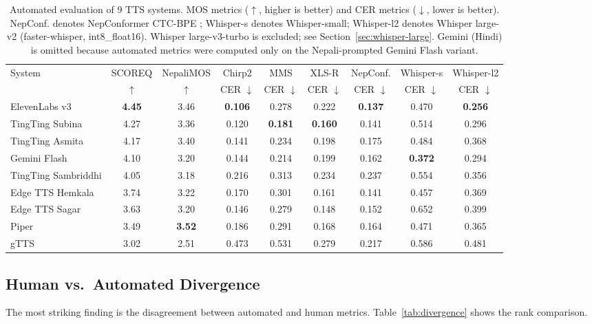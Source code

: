 \documentclass[11pt]{article}
\begin{document}
\begin{table}[t]
\centering
\caption{Automated evaluation of 9 TTS systems. MOS metrics ($\uparrow$, higher is better) and CER metrics ($\downarrow$, lower is better). NepConf. denotes NepConformer CTC-BPE \citep{poudel2026nepconformer}; Whisper-s denotes Whisper-small; Whisper-l2 denotes Whisper large-v2 (faster-whisper, int8\_float16). Whisper large-v3-turbo is excluded; see Section~\ref{sec:whisper-large}. Gemini (Hindi) is omitted because automated metrics were computed only on the Nepali-prompted Gemini Flash variant.}
\label{tab:auto_metrics}
\footnotesize
\setlength{\tabcolsep}{2pt}
\begin{tabular}{lcccccccc}
\toprule
System & SCOREQ & NepaliMOS & Chirp2 & MMS & XLS-R & NepConf. & Whisper-s & Whisper-l2 \\
 & $\uparrow$ & $\uparrow$ & CER $\downarrow$ & CER $\downarrow$ & CER $\downarrow$ & CER $\downarrow$ & CER $\downarrow$ & CER $\downarrow$ \\
\midrule
ElevenLabs v3 & \textbf{4.45} & 3.46 & \textbf{0.106} & 0.278 & 0.222 & \textbf{0.137} & 0.470 & \textbf{0.256} \\
TingTing Subina & 4.27 & 3.36 & 0.120 & \textbf{0.181} & \textbf{0.160} & 0.141 & 0.514 & 0.296 \\
TingTing Asmita & 4.17 & 3.40 & 0.141 & 0.234 & 0.198 & 0.175 & 0.484 & 0.368 \\
Gemini Flash & 4.10 & 3.20 & 0.144 & 0.214 & 0.199 & 0.162 & \textbf{0.372} & 0.294 \\
TingTing Sambriddhi & 4.05 & 3.18 & 0.216 & 0.313 & 0.234 & 0.237 & 0.554 & 0.356 \\
Edge TTS Hemkala & 3.74 & 3.22 & 0.170 & 0.301 & 0.161 & 0.141 & 0.457 & 0.369 \\
Edge TTS Sagar & 3.63 & 3.20 & 0.146 & 0.279 & 0.148 & 0.152 & 0.652 & 0.399 \\
Piper & 3.49 & \textbf{3.52} & 0.186 & 0.291 & 0.168 & 0.164 & 0.471 & 0.365 \\
gTTS & 3.02 & 2.51 & 0.473 & 0.531 & 0.279 & 0.217 & 0.586 & 0.481 \\
\bottomrule
\end{tabular}
\end{table}

\subsection{Human vs.\ Automated Divergence}

The most striking finding is the disagreement between automated and human metrics. Table~\ref{tab:divergence} shows the rank comparison.
\end{document}

